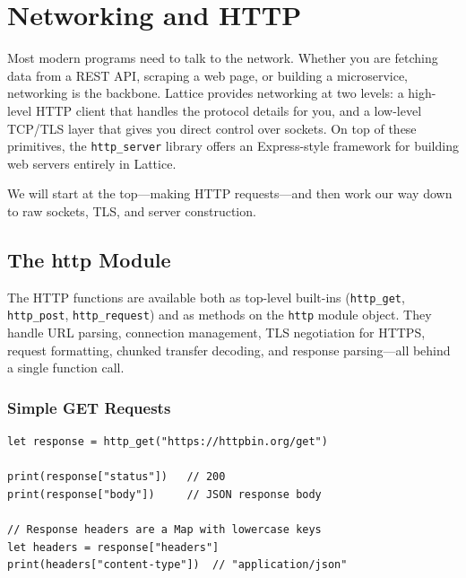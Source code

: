 \chapter{Networking and HTTP}\label{ch:networking}


Most modern programs need to talk to the network. Whether you are fetching
data from a REST API, scraping a web page, or building a microservice,
networking is the backbone. Lattice provides networking at two levels: a
high-level HTTP client that handles the protocol details for you, and a
low-level TCP/TLS layer that gives you direct control over sockets. On top of
these primitives, the \texttt{http\_server} library offers an Express-style
framework for building web servers entirely in Lattice.

We will start at the top---making HTTP requests---and then work our way down
to raw sockets, TLS, and server construction.

\section{The http Module}\label{sec:http-module}


The HTTP functions are available both as top-level built-ins
(\lstinline|http_get|, \lstinline|http_post|, \lstinline|http_request|) and
as methods on the \lstinline|http| module object. They handle URL parsing,
connection management, TLS negotiation for HTTPS, request formatting,
chunked transfer decoding, and response parsing---all behind a single
function call.

\subsection{Simple GET Requests}\label{sec:http-get}

\begin{lstlisting}[language=Lattice, caption={Making an HTTP GET request}]
let response = http_get("https://httpbin.org/get")

print(response["status"])   // 200
print(response["body"])     // JSON response body

// Response headers are a Map with lowercase keys
let headers = response["headers"]
print(headers["content-type"])  // "application/json"
\end{lstlisting}

